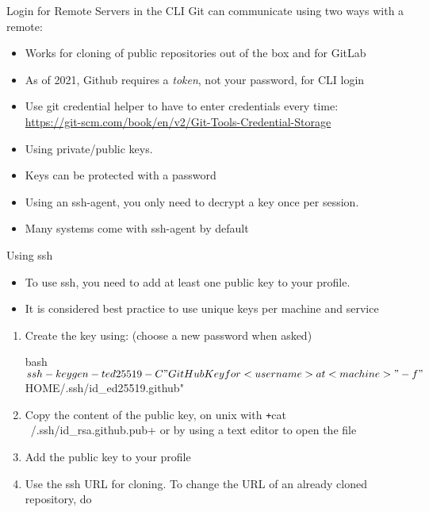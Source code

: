 \begin{frame}[fragile]{Login for Remote Servers in the CLI}
  Git can communicate using two ways with a remote:

  \begin{description}[HTTPS]
    \item[HTTPS]
      \begin{itemize}
        \item Works for cloning of public repositories out of the box and for GitLab
        \item As of 2021, Github requires a \emph{token}, not your password, for CLI login
        \item Use git credential helper to have to enter credentials every time:\\
          {\small\url{https://git-scm.com/book/en/v2/Git-Tools-Credential-Storage}}
      \end{itemize}
    \item[SSH]
      \begin{itemize}
        \item Using private/public keys.
        \item Keys can be protected with a password
        \item Using an ssh-agent, you only need to decrypt a key once per session.
        \item Many systems come with ssh-agent by default
      \end{itemize}
  \end{description}
\end{frame}

\begin{frame}[fragile]{Using ssh}

  \begin{itemize}
    \item To use ssh, you need to add at least one public key to your profile.
    \item It is considered best practice to use unique keys per machine and service
  \end{itemize}

  \begin{enumerate}
    \item Create the key using: (choose a new password when asked)
      \begin{code}[title={Works in Powershell (Windows) and Unix Systems}]{bash}
        $ ssh-keygen -t ed25519 -C "GitHub Key for <username> at <machine>" -f "$HOME/.ssh/id_ed25519.github"
      \end{code}
    \item Copy the content of the public key, on unix with \texttt+cat ~/.ssh/id_rsa.github.pub+ or by using a text editor to open the file
    \item Add the public key to your profile
    \item Use the ssh URL for cloning. To change the URL of an already cloned repository, do
  \end{enumerate}
\end{frame}

